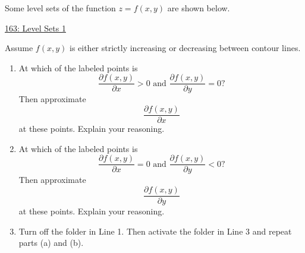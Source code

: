 \documentclass{ximera}
\begin{document}
\begin{example} \label{ExLdkjr3rffds}

Some level sets of the function $z=f(x,y)$ are shown below.

\begin{onlineOnly}
    \begin{center}
\end{center}
\end{onlineOnly}

\href{https://www.desmos.com/calculator/avxpstt5t2}{163: Level Sets 1}

Assume $f(x,y)$ is either strictly increasing or decreasing between contour lines.

\begin{enumerate}
\item At which of the labeled points is
\[
    \frac{\partial f(x,y)}{\partial x} > 0 \text{ and }  \frac{\partial f(x,y)}{\partial y} = 0 ?
\]
Then approximate 
\[
  \frac{\partial f(x,y)}{\partial x}
\]
at these points. Explain your reasoning.

\item At which of the labeled points is
\[
    \frac{\partial f(x,y)}{\partial x} = 0 \text{ and }  \frac{\partial f(x,y)}{\partial y} < 0 ?
\]
Then approximate
\[
  \frac{\partial f(x,y)}{\partial y}
\]
at these points. Explain your reasoning.

\item Turn off the folder in Line 1. Then activate the folder in Line 3 and repeat parts (a) and (b).
\end{enumerate}

 
\end{example}
\end{document}
